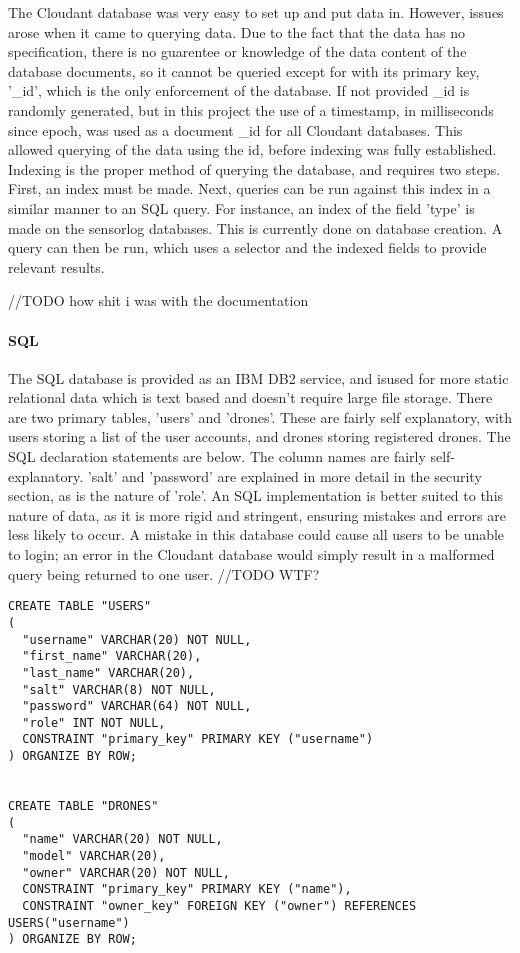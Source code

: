 \documentclass{article}
\begin{document}
The Cloudant database was very easy to set up and put data in. However, issues arose when it came to querying data. Due to the fact that the data has no specification, there is no guarentee or knowledge of the data content of the database documents, so it cannot be queried except for with its primary key, '\_id', which is the only enforcement of the database. If not provided \_id is randomly generated, but in this project the use of a timestamp, in milliseconds since epoch, was used as a document \_id for all Cloudant databases. This allowed querying of the data using the id, before indexing was fully established. Indexing is the proper method of querying the database, and requires two steps. First, an index must be made. Next, queries can be run against this index in a similar manner to an SQL query. For instance, an index of the field 'type' is made on the sensorlog databases. This is currently done on database creation. A query can then be run, which uses a selector and the indexed fields to provide relevant results.

//TODO how shit i was with the documentation 


\paragraph{SQL} \label{SQL}
The SQL database is provided as an IBM DB2 service, and isused for more static relational data which is text based and doesn't require large file storage. There are two primary tables, 'users' and 'drones'. These are fairly self explanatory, with users storing a list of the user accounts, and drones storing registered drones. The SQL declaration statements are below. The column names are fairly self-explanatory. 'salt' and 'password' are explained in more detail in the security section, as is the nature of 'role'. An SQL implementation is better suited to this nature of data, as it is more rigid and stringent, ensuring mistakes and errors are less likely to occur. A mistake in this database could cause all users to be unable to login; an error in the Cloudant database would simply result in a malformed query being returned to one user. //TODO WTF?

\begin{center}
\begin{lstlisting} 
CREATE TABLE "USERS"
(
  "username" VARCHAR(20) NOT NULL,
  "first_name" VARCHAR(20),
  "last_name" VARCHAR(20),
  "salt" VARCHAR(8) NOT NULL,
  "password" VARCHAR(64) NOT NULL,
  "role" INT NOT NULL,
  CONSTRAINT "primary_key" PRIMARY KEY ("username")
) ORGANIZE BY ROW;


CREATE TABLE "DRONES"
(
  "name" VARCHAR(20) NOT NULL,
  "model" VARCHAR(20),
  "owner" VARCHAR(20) NOT NULL,
  CONSTRAINT "primary_key" PRIMARY KEY ("name"),
  CONSTRAINT "owner_key" FOREIGN KEY ("owner") REFERENCES USERS("username")
) ORGANIZE BY ROW;
\end{lstlisting}
\end{center}
\end{document}
